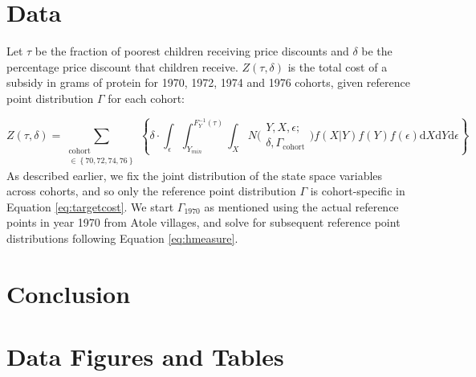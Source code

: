 \documentclass[12pt,english]{article}
\begin{document}
\section{Data}

Let $\tau$ be the fraction of poorest children receiving price discounts and $\delta$ be the percentage price discount that children receive. $Z\left(\tau,\delta\right)$ is the total cost of a subsidy in grams of protein for 1970, 1972, 1974 and 1976 cohorts, given reference point distribution $\Gamma$ for each cohort:

\begin{equation}
\label{eq:targetcost}
Z\left(\tau,\delta\right) =
\sum\limits_{
	\substack{
	\mathrm{cohort} \\ \in{\left\{70,72,74,76\right\}}}
	}
\left\{\delta\cdot
\int_{\epsilon}
\int_{Y_{min}}^{F_{Y}^{-1}\left(\tau\right)}
\int_{X}
N\Big(
\substack{
	Y,X,\epsilon; \\
	\delta, \Gamma_{\mathrm{cohort}}
}
\Big)f\left(X|Y\right)f\left(Y\right)f\left(\epsilon\right)\mathrm{d}X\mathrm{d}Y\mathrm{d}\epsilon\right\}
\end{equation}
As described earlier, we fix the joint distribution of the state space variables across cohorts, and so only the reference point distribution $\Gamma$ is cohort-specific in Equation \ref{eq:targetcost}. We start $\Gamma_{1970}$ as mentioned using the actual reference points in year 1970 from Atole villages, and solve for subsequent reference point distributions following Equation \ref{eq:hmeasure}.


\section{Conclusion}

\pagebreak

\pagebreak

\appendix
\section{Data Figures and Tables}
\end{document}
